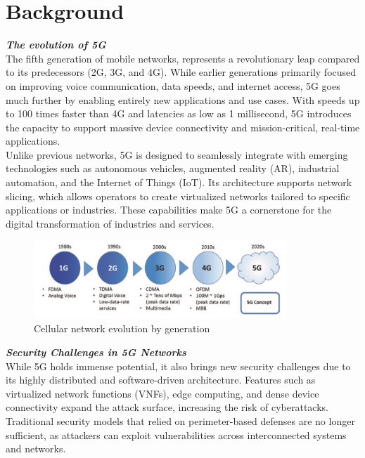 \documentclass{report}
\begin{document}
\section{Background}
\textbf{\textit{The evolution of 5G}}\\
The fifth generation of mobile networks, represents a revolutionary leap compared to its predecessors (2G, 3G, and 4G). While earlier generations primarily focused on improving voice communication, data speeds, and internet access, 5G goes much further by enabling entirely new applications and use cases. With speeds up to 100 times faster than 4G and latencies as low as 1 millisecond, 5G introduces the capacity to support massive device connectivity and mission-critical, real-time applications.\\Unlike previous networks, 5G is designed to seamlessly integrate with emerging technologies such as autonomous vehicles, augmented reality (AR), industrial automation, and the Internet of Things (IoT). Its architecture supports network slicing, which allows operators to create virtualized networks tailored to specific applications or industries. These capabilities make 5G a cornerstone for the digital transformation of industries and services.

\begin{figure}[h]
    \centering
    \includegraphics[width=0.85\textwidth]{figures/1gto5g.png}
    \caption{Cellular network evolution by generation\cite{wan_lei_2020}}
    \label{fig:history1gto5g}
\end{figure}

\textbf{\textit{Security Challenges in 5G Networks}}\\
While 5G holds immense potential, it also brings new security challenges due to its highly distributed and software-driven architecture. Features such as virtualized network functions (VNFs), edge computing, and dense device connectivity expand the attack surface, increasing the risk of cyberattacks. Traditional security models that relied on perimeter-based defenses are no longer sufficient, as attackers can exploit vulnerabilities across interconnected systems and networks.\\\\
\end{document}
